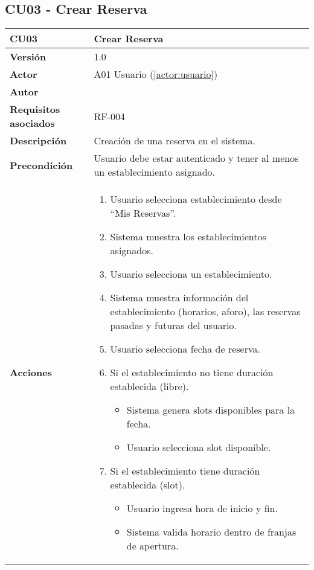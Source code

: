 \subsection{CU03 - Crear Reserva}

\begin{table}[H]
	\centering
	\begin{tabularx}{\linewidth}{ p{} p{} }
		\toprule
		\textbf{CU03}    & \textbf{Crear Reserva} \\
		\toprule
		\textbf{Versión}              & 1.0    \\
		\textbf{Actor}                & A01 Usuario (\ref{actor:usuario}) \\
		\textbf{Autor}                & \nombre \\
		\textbf{Requisitos asociados} & RF-004 \\
		\textbf{Descripción}          & Creación de una reserva en el sistema. \\
		\textbf{Precondición}         & Usuario debe estar autenticado y tener al menos un establecimiento asignado. \\
		\textbf{Acciones}             &
		\begin{enumerate}
			\def\labelenumi{\arabic{enumi}.}
			\tightlist
			\item Usuario selecciona establecimiento desde ``Mis Reservas''.
            \item Sistema muestra los establecimientos asignados.
            \item Usuario selecciona un establecimiento.
            \item Sistema muestra información del establecimiento (horarios, aforo), las reservas pasadas y futuras del usuario.
            \item Usuario selecciona fecha de reserva.
            \item Si el establecimiento no tiene duración establecida (libre).
   		\begin{itemize}
  			\item Sistema genera slots disponibles para la fecha.
			  \item Usuario selecciona slot disponible.
  		\end{itemize}
            \item Si el establecimiento tiene duración establecida (slot).
   		\begin{itemize}
  			\item Usuario ingresa hora de inicio y fin.
			  \item Sistema valida horario dentro de franjas de apertura.

\end{itemize}
\end{enumerate}
\end{tabularx}
\end{table}
